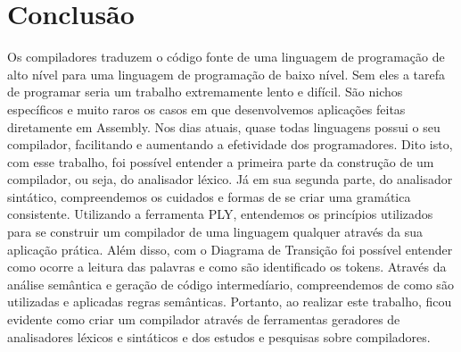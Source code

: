 \documentclass[
	12pt,				%
	openright,			%
	twoside,			%
	a4paper,			%
	english,			%
	french,				%
	spanish,			%
	brazil				%
	]{abntex2}
\begin{document}
\chapter*[Conclusão]{Conclusão}
Os compiladores traduzem o código fonte de uma linguagem de programação
de alto nível para uma linguagem de programação de baixo nível. Sem eles 
a tarefa de programar seria um trabalho extremamente lento e difícil.
São nichos específicos e muito raros os casos em que desenvolvemos
aplicações feitas diretamente em Assembly. Nos dias atuais, quase todas linguagens
possui o seu compilador, facilitando e aumentando a efetividade dos programadores.
Dito isto, com esse trabalho, foi possível entender a primeira parte da construção
de um compilador, ou seja, do analisador léxico. Já em sua segunda parte, do analisador sintático,
compreendemos os cuidados e formas de se criar uma gramática consistente. Utilizando a ferramenta PLY,
entendemos os princípios utilizados para se construir um compilador de uma
linguagem qualquer através da sua aplicação prática. Além disso, com o Diagrama
de Transição foi possível entender como ocorre a leitura das palavras e como são
identificado os tokens. Através da análise semântica e geração de código intermedíario,
compreendemos de como são utilizadas e aplicadas regras semânticas. Portanto, ao realizar este trabalho,
ficou evidente como criar um compilador através de ferramentas geradores de 
analisadores léxicos e sintáticos e dos estudos e pesquisas sobre compiladores.

\end{document}
